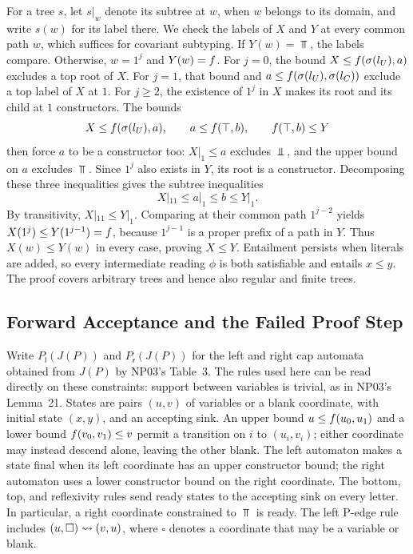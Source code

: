 For a tree $s$, let $s|_w$ denote its subtree at $w$, when $w$ belongs
to its domain, and write $s(w)$ for its label there. We check the labels of $X$ and $Y$ at every common
path $w$, which suffices for covariant subtyping. If $Y(w)=\Top$,
the labels compare. Otherwise, $w=1^j$ and $Y(w)=f$.
For $j=0$, the bound $X\le f(\sigma(l_U),a)$ excludes a top root
of $X$. For $j=1$, that bound and
$a\le f(\sigma(l_U),\sigma(l_C))$ exclude a top label of $X$ at $1$.
For $j\ge2$, the existence of $1^j$ in $X$ makes its root and its
child at $1$ constructors. The bounds
\[
 X\le f(\sigma(l_U),a),\qquad
 a\le f(\top,b),\qquad
 f(\top,b)\le Y
\]
then force $a$ to be a constructor too: $X|_1\le a$ excludes $\Bot$,
and the upper bound on $a$ excludes $\Top$.
Since $1^j$ also exists in $Y$, its root is a constructor.
Decomposing these three inequalities gives the subtree inequalities
\[
 X|_{11}\le a|_1\le b\le Y|_1.
\]
By transitivity, $X|_{11}\le Y|_1$. Comparing at their common path
$1^{j-2}$ yields
$X(1^j)\le Y(1^{j-1})=f$, because $1^{j-1}$ is a proper prefix
of a path in $Y$. Thus $X(w)\le Y(w)$ in every case, proving $X\le Y$.
Entailment persists when literals are added, so every intermediate
reading $\phi$ is both satisfiable and entails $x\le y$.
The proof covers arbitrary trees and hence also regular and finite trees.

\subsection{Forward Acceptance and the Failed Proof Step}

Write $P_{\mathsf l}(J(P))$ and $P_{\mathsf r}(J(P))$ for the left and
right cap automata obtained from $J(P)$ by NP03's Table~3.
The rules used here can be read directly on these constraints: support
between variables is trivial, as in NP03's Lemma~21.
States are pairs $(u,v)$ of variables or a blank
coordinate, with initial state $(x,y)$, and an accepting sink.
An upper bound $u\le f(u_0,u_1)$ and a lower bound
$f(v_0,v_1)\le v$ permit a transition on $i$ to $(u_i,v_i)$;
either coordinate may instead descend alone, leaving the other blank.
The left automaton makes a state final when its left coordinate has an
upper constructor bound; the right automaton uses a lower constructor
bound on the right coordinate. The bottom, top, and reflexivity rules
send ready states to the accepting sink on every letter. In particular,
a right coordinate constrained to $\Top$ is ready.
The left P-edge rule includes $(u,\square)\rightsquigarrow(v,u)$, where
$\square$ denotes a coordinate that may be a variable or blank.

